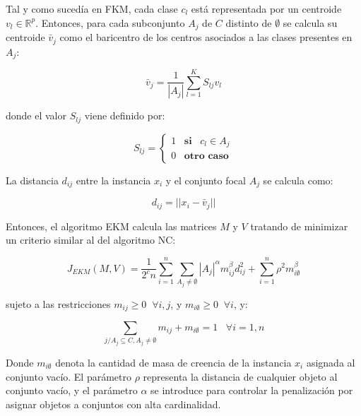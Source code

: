 Tal y como sucedía en \acf{FKM}, cada clase $c_l$ está representada por un centroide $v_l \in \mathbb{R}^p$. Entonces, para cada subconjunto $A_j$ de $C$ distinto de $\emptyset$ se calcula su centroide $\bar{v}_j$ como el baricentro de los centros asociados a las clases presentes en $A_j$:

\begin{equation}
\bar{v}_j = \frac{1}{|A_j|} \sum_{l=1}^{K} S_{lj} v_l
\label{eqn11}
\end{equation}

donde el valor $S_{lj}$ viene definido por:

\begin{equation}
S_{lj} = \begin{cases}
1 \;\;\; \textbf{si} \;\;\; c_l \in A_j\\
0 \;\;\; \textbf{otro caso}
\end{cases}
\label{eqn12}
\end{equation}

La distancia $d_{ij}$ entre la instancia $x_i$ y el conjunto focal $A_j$ se calcula como:

\begin{equation}
d_{ij} = ||x_i - \bar{v}_j||
\label{eqn13}
\end{equation}

Entonces, el algoritmo \acs{EKM} calcula las matrices $M$ y $V$ tratando de minimizar un criterio similar al del algoritmo \acs{NC}:

\begin{equation}
J_{EKM}(M,V) = \frac{1}{2^cn} \sum_{i=1}^{n}\sum_{A_j \neq \emptyset} |A_j|^\alpha m_{ij}^\beta d_{ij}^2 + \sum_{i=1}^{n} \rho^2 m_{i\emptyset}^\beta
\label{eqn14}
\end{equation}

sujeto a las restricciones $m_{ij} \ge 0 \;\; \forall i,j$, y $m_{i\emptyset} \ge 0 \;\; \forall i$, y:

\begin{equation}
\sum_{j/A_j \subseteq C, A_j \neq \emptyset} m_{ij} + m_{i\emptyset} = 1 \;\;\; \forall i = 1,n
\label{eqn15}
\end{equation}

Donde $m_{i\emptyset}$ denota la cantidad de masa de creencia de la instancia $x_i$ asignada al conjunto vacío. El parámetro $\rho$ representa la distancia de cualquier objeto al conjunto vacío, y el parámetro $\alpha$ se introduce para controlar la penalización por asignar objetos a conjuntos con alta cardinalidad.

